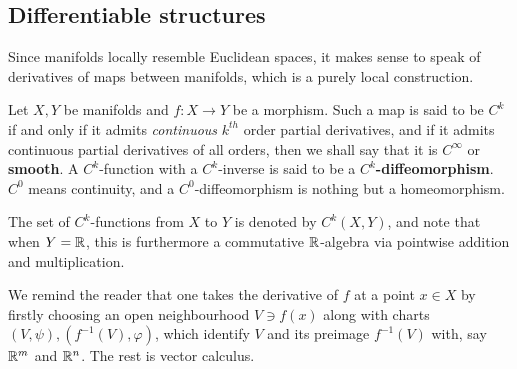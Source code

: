     \subsection{Differentiable structures}
        Since manifolds locally resemble Euclidean spaces, it makes sense to speak of derivatives of maps between manifolds, which is a purely local construction.
        \begin{definition} \label{def: differentiable_functions}
            Let $X, Y$ be manifolds and $f: X \to Y$ be a morphism. Such a map is said to be $C^k$ if and only if it admits \textit{continuous} $k^{th}$ order partial derivatives, and if it admits continuous partial derivatives of all orders, then we shall say that it is $C^{\infty}$ or \textbf{smooth}. A $C^k$-function with a $C^k$-inverse is said to be a \textbf{$C^k$-diffeomorphism}. $C^0$ means continuity, and a $C^0$-diffeomorphism is nothing but a homeomorphism.

            The set of $C^k$-functions from $X$ to $Y$ is denoted by $C^k(X, Y)$, and note that when $Y = \mathbb{R}$, this is furthermore a commutative $\mathbb{R}$-algebra via pointwise addition and multiplication.
        \end{definition}
        We remind the reader that one takes the derivative of $f$ at a point $x \in X$ by firstly choosing an open neighbourhood $V \ni f(x)$ along with charts $(V, \psi), (f^{-1}(V), \varphi)$, which identify $V$ and its preimage $f^{-1}(V)$ with, say $\mathbb{R}^m$ and $\mathbb{R}^n$. The rest is vector calculus.

